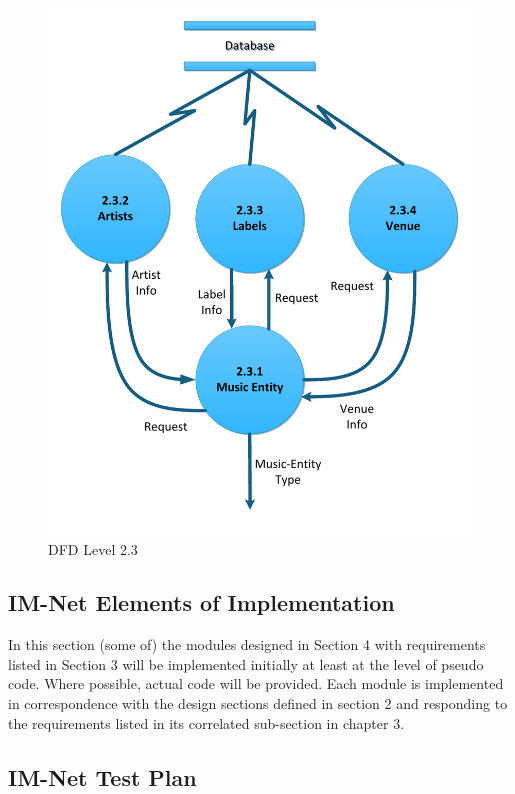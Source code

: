 \documentclass[letterpaper,12pt]{article}
\begin{document}
{\eject

\begin{figure}[h]
\centering
\includegraphics[scale=0.6]{DFD_level_2_3.pdf}
\caption{DFD Level 2.3}
\label{fig:DFD_level_2.3}
\end{figure}

\eject

 
\textcolor{section}{\section{IM-Net Elements of Implementation}}

In this section (some of) the modules designed in Section 4 with requirements listed in Section 3 will be implemented initially at least at the level of pseudo code. Where possible, actual code will be provided. Each module is implemented in correspondence with the design sections defined in section 2 and responding to the requirements listed in its correlated sub-section in chapter 3.

\eject 

\textcolor{section}{\section{IM-Net Test Plan}}

}
\end{document}
